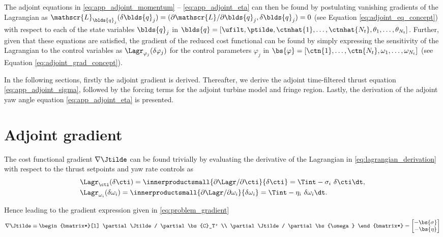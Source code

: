 The adjoint equations in \eqref{eq:app_adjoint_momentum} -- \eqref{eq:app_adjoint_eta} can then be found by postulating vanishing gradients of the Lagrangian as  $\mathscr{L}_{\blds{q}_j}(\delta \blds{q}_j)= (\partial \mathscr{L}/\partial \blds{q}_j, \delta \blds{q}_j) = 0$ (see Equation \ref{eq:adjoint_eq_concept}) with respect to each of the state variables $\blds{q}_j$ in $\blds{q} = [\ufilt, \ptilde, \ctnhat{1}, \dots, \ctnhat{N_t}, \theta_1, \dots, \theta_{N_t}]$.  Further, given that these equations are satisfied, the gradient of the reduced cost functional can be found by simply expressing the sensitivity of the Lagrangian to the control variables as $\Lagr_{\varphi_j}(\delta \varphi_j)$ for the control parameters $\varphi_j$ in $\bs{\varphi} = [\ctn{1}, \dots, \ctn{N_t}, \omega_1, \dots, \omega_{N_t}]$ (see Equation \ref{eq:adjoint_grad_concept}).

In the following sections, firstly the adjoint gradient is derived. Thereafter, we derive the adjoint time-filtered thrust equation \eqref{eq:app_adjoint_sigma}, followed by the forcing terms for the adjoint turbine model and fringe region. Lastly, the derivation of the adjoint yaw angle equation \eqref{eq:app_adjoint_eta} is presented. 


\section{Adjoint gradient}
The cost functional gradient $\nabla \Jtilde$ can be found trivially by evaluating the derivative of the Lagrangian in \eqref{eq:lagrangian_derivation} with respect to the thrust setpoints and yaw rate controls as 
\begin{align}
	&\Lagr_{\cti}(\delta\cti) = \innerproductsmall{\partial \Lagr /\partial \cti}{\delta \cti} = \Tint -\sigma_i \ \delta \cti \dt, \label{eq:app_adjoint_grad_sigma}\\
	&\Lagr_{\omega_i}(\delta\omega_i) = \innerproductsmall{\partial \Lagr /\partial \omega_i}{\delta \omega_i} = \Tint -\eta_i \ \delta \omega_i \dt. \label{eq:app_adjoint_grad_eta}
\end{align}

Hence leading to the gradient expression given in \eqref{eq:problem_gradient}
\begin{equation}
\nabla \Jtilde \equiv 
\begin{bmatrix*}[l]
\partial \Jtilde / \partial \bs{C}_T' \\
\partial \Jtilde / \partial \bs{\omega} 
\end{bmatrix*} = 
\begin{bmatrix}
- \bs{\sigma}\\
- \bs{\eta}
\end{bmatrix}
\end{equation}



